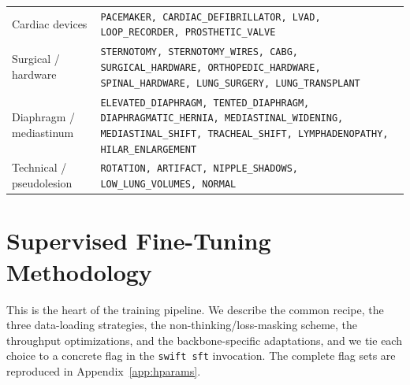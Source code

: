 \documentclass[11pt,a4paper]{article}
\begin{document}
\begin{table}[H]
\begin{tabularx}{\textwidth}{L L}
Cardiac devices & \texttt{PACEMAKER, CARDIAC\_DEFIBRILLATOR, LVAD, LOOP\_RECORDER, PROSTHETIC\_VALVE} \\
Surgical / hardware & \texttt{STERNOTOMY, STERNOTOMY\_WIRES, CABG, SURGICAL\_HARDWARE, ORTHOPEDIC\_HARDWARE, SPINAL\_HARDWARE, LUNG\_SURGERY, LUNG\_TRANSPLANT} \\
Diaphragm / mediastinum & \texttt{ELEVATED\_DIAPHRAGM, TENTED\_DIAPHRAGM, DIAPHRAGMATIC\_HERNIA, MEDIASTINAL\_WIDENING, MEDIASTINAL\_SHIFT, TRACHEAL\_SHIFT, LYMPHADENOPATHY, HILAR\_ENLARGEMENT} \\
Technical / pseudolesion & \texttt{ROTATION, ARTIFACT, NIPPLE\_SHADOWS, LOW\_LUNG\_VOLUMES, NORMAL} \\
\bottomrule
\end{tabularx}
\end{table}

\section{Supervised Fine-Tuning Methodology}
\label{sec:sft}

This is the heart of the training pipeline. We describe the common recipe, the three data-loading strategies, the non-thinking/loss-masking scheme, the throughput optimizations, and the backbone-specific adaptations, and we tie each choice to a concrete flag in the \texttt{swift sft} invocation. The complete flag sets are reproduced in Appendix~\ref{app:hparams}.
\end{document}
